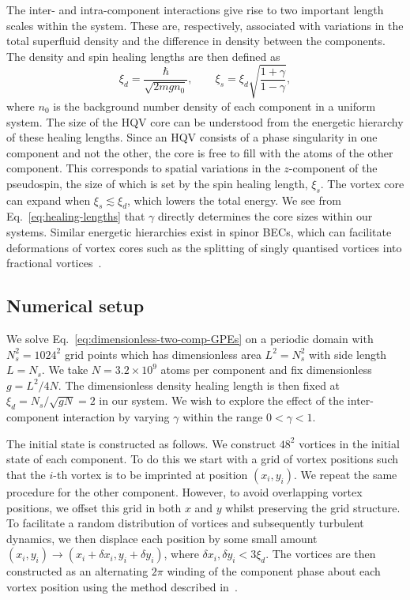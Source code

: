 The inter- and intra-component interactions give rise to two important length
scales within the system.
These are, respectively, associated with variations in the total superfluid
density and the difference in density between the components.
The density and spin healing lengths are then defined as~\cite{Eto2011}
\begin{equation}
    \xi_d = \frac{\hbar}{\sqrt{2mgn_0}}, \qquad 
    \xi_s = \xi_d \sqrt{\frac{1 + \gamma}{1 - \gamma}},
    \label{eq:healing-lengths}
\end{equation}
where \(n_0\) is the background number density of each component in a uniform
system.
The size of the HQV core can be understood from the energetic hierarchy of
these healing lengths.
Since an HQV consists of a phase singularity in one component and not the other,
the core is free to fill with the atoms of the other component.
This corresponds to spatial variations in the \( z \)-component of the
pseudospin, the size of which is set by the spin healing length, \(\xi_s\).
The vortex core can expand when \(\xi_s \lesssim \xi_d\), which lowers
the total energy.
We see from Eq.~\eqref{eq:healing-lengths} that \(\gamma \) directly determines
the core sizes within our systems.
Similar energetic hierarchies exist in spinor BECs, which can facilitate
deformations of vortex cores such as the splitting of singly quantised vortices
into fractional vortices~\cite{Seo2015}.

\subsection{Numerical setup}\label{sec:numerical-setup}
We solve Eq.~\eqref{eq:dimensionless-two-comp-GPEs} on a periodic domain with 
\(N_s^2=1024^2\) grid points which has dimensionless area \(L^2=N_s^2\) with
side length \(L=N_s\).
We take \(N=3.2\times10^9\) atoms per component and fix dimensionless
\(g=L^2/4N\).
The dimensionless density healing length is then fixed at
\(\xi_d=N_s/\sqrt{gN}=2\) in our system.
We wish to explore the effect of the inter-component interaction by varying
\(\gamma \) within the range \(0 < \gamma < 1\).

The initial state is constructed as follows.
We construct \(48^2\) vortices in the initial state of each component.
To do this we start with a grid of vortex positions such that the 
\(i\)-th vortex is to be imprinted at position \((x_i, y_i)\).
We repeat the same procedure for the other component.
However, to avoid overlapping vortex positions, we offset this grid in both
\(x\) and \(y\) whilst preserving the grid structure.
To facilitate a random distribution of vortices and subsequently turbulent
dynamics, we then displace each position by some small amount 
\((x_i, y_i) \rightarrow (x_i + \delta x_i, y_i + \delta y_i)\), where 
\(\delta x_i, \delta y_i < 3\xi_d\).
The vortices are then constructed as an alternating \( 2\pi \) winding of the
component phase about each vortex position using the method described
in~\cite{Billam2014}.

